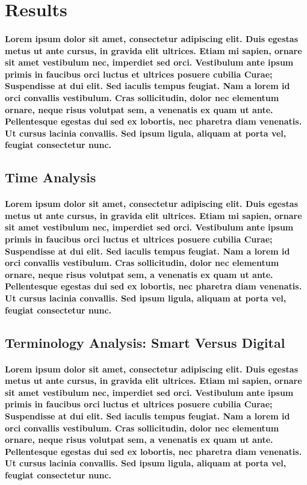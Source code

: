 \documentclass[11pt, twocolumn]{article}
\begin{document}
\section{Results}
\paragraph{Lorem ipsum dolor sit amet, consectetur adipiscing elit. Duis egestas metus ut ante cursus, in gravida elit ultrices. Etiam mi sapien, ornare sit amet vestibulum nec, imperdiet sed orci. Vestibulum ante ipsum primis in faucibus orci luctus et ultrices posuere cubilia Curae; Suspendisse at dui elit. Sed iaculis tempus feugiat. Nam a lorem id orci convallis vestibulum. Cras sollicitudin, dolor nec elementum ornare, neque risus volutpat sem, a venenatis ex quam ut ante. Pellentesque egestas dui sed ex lobortis, nec pharetra diam venenatis. Ut cursus lacinia convallis. Sed ipsum ligula, aliquam at porta vel, feugiat consectetur nunc.}

\subsection{Time Analysis}
\paragraph{Lorem ipsum dolor sit amet, consectetur adipiscing elit. Duis egestas metus ut ante cursus, in gravida elit ultrices. Etiam mi sapien, ornare sit amet vestibulum nec, imperdiet sed orci. Vestibulum ante ipsum primis in faucibus orci luctus et ultrices posuere cubilia Curae; Suspendisse at dui elit. Sed iaculis tempus feugiat. Nam a lorem id orci convallis vestibulum. Cras sollicitudin, dolor nec elementum ornare, neque risus volutpat sem, a venenatis ex quam ut ante. Pellentesque egestas dui sed ex lobortis, nec pharetra diam venenatis. Ut cursus lacinia convallis. Sed ipsum ligula, aliquam at porta vel, feugiat consectetur nunc.}

\subsection{Terminology Analysis: Smart Versus Digital}
\paragraph{Lorem ipsum dolor sit amet, consectetur adipiscing elit. Duis egestas metus ut ante cursus, in gravida elit ultrices. Etiam mi sapien, ornare sit amet vestibulum nec, imperdiet sed orci. Vestibulum ante ipsum primis in faucibus orci luctus et ultrices posuere cubilia Curae; Suspendisse at dui elit. Sed iaculis tempus feugiat. Nam a lorem id orci convallis vestibulum. Cras sollicitudin, dolor nec elementum ornare, neque risus volutpat sem, a venenatis ex quam ut ante. Pellentesque egestas dui sed ex lobortis, nec pharetra diam venenatis. Ut cursus lacinia convallis. Sed ipsum ligula, aliquam at porta vel, feugiat consectetur nunc.}
\end{document}
